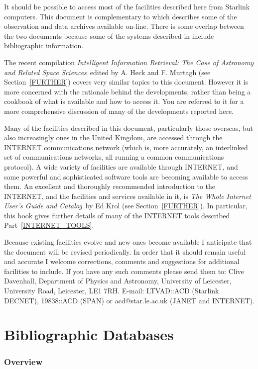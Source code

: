 It should be possible to access most of the facilities described here 
from Starlink computers. This document is complementary to
 which
describes some of the observation and data archives available on-line.
There is some overlap between the two documents because some of the
systems described in
 include bibliographic information.

The recent compilation {\it Intelligent Information Retrieval: The
Case of Astronomy and Related Space Sciences}\, edited by A. Heck and
F. Murtagh (see Section~\ref{FURTHER}) covers very similar topics to 
this document. However it is more concerned with the rationale behind
the developments, rather than being a cookbook of what is available
and how to access it.  You are referred to it for a more comprehensive
discussion of many of the developments reported here.

Many of the facilities described in this document, particularly those 
overseas, but also increasingly ones in the United Kingdom, are accessed
through the INTERNET communications network (which is, more accurately, 
an interlinked set of communications networks, all running a common 
communications protocol). A wide variety of facilities are available 
through INTERNET, and some powerful and sophisticated software tools 
are becoming available to access them. An excellent and thoroughly 
recommended introduction to the INTERNET, and the facilities and 
services available in it, is {\it The Whole Internet User's Guide and 
Catalog}\, by Ed Krol (see Section~\ref{FURTHER}). In particular, this 
book gives further details of many of the INTERNET tools described
Part~\ref{INTERNET_TOOLS}.

Because existing facilities evolve and new ones become available I 
anticipate that the document will be revised periodically. In order that
it should remain useful and accurate I welcome corrections, comments and
suggestions for additional facilities to include. If you have any such 
comments please send them to: Clive Davenhall, Department of Physics and
Astronomy, University of Leicester, University Road, Leicester, LE1 7RH.
E-mail: LTVAD::ACD (Starlink DECNET), 19838::ACD (SPAN) or 
acd@star.le.ac.uk (JANET and INTERNET).


\pagebreak
\part{Bibliographic Databases}

\section{Overview} 

